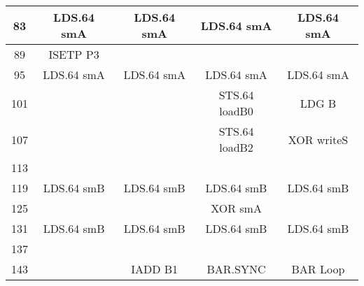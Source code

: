 \begin{table}[htbp]
{\begin{tabular}{|c|c|c|c|c|}
    83 & LDS.64 smA & LDS.64 smA & LDS.64 smA & LDS.64 smA \\
    \hline
    89 &ISETP P3 & & &\\
    \hline
    95 & LDS.64 smA & LDS.64 smA & LDS.64 smA & LDS.64 smA \\
    \hline
    101 & & & STS.64 loadB0 & LDG B \\
    \hline
    107 & & & STS.64 loadB2 & XOR writeS \\
    \hline
    113 & & & & \\
    \hline
    119 & LDS.64 smB & LDS.64 smB & LDS.64 smB & LDS.64 smB \\
    \hline
    125 & & & XOR smA & \\
    \hline
    131 & LDS.64 smB & LDS.64 smB & LDS.64 smB & LDS.64 smB \\
    \hline
    137 & & & & \\
    \hline
    143 & & IADD B1 & BAR.SYNC & BAR Loop \\
    \hline
\end{tabular}
}
\end{table}
